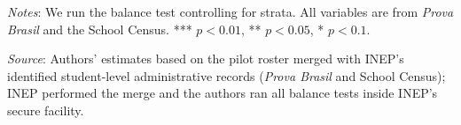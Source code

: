 \documentclass[
	article,			%
	12pt,				%
	oneside,			%
	a4paper,			%
	]{article}
\begin{document}
\begin{table}[h!]
\begin{threeparttable}
\begin{tabular*}{\textwidth}{@{\extracolsep{\fill}}lccccc@{}}
\bottomrule
\end{tabular*}
\begin{tablenotes}
\fontsize{9}{9}\selectfont
\item \textit{Notes}: We run the balance test controlling for strata. All variables are from \textit{Prova Brasil} and the School Census. *** $p<0.01$, ** $p<0.05$, * $p<0.1$.
\item \textit{Source}: Authors' estimates based on the pilot roster merged with INEP's identified student-level administrative records (\textit{Prova Brasil} and School Census); INEP performed the merge and the authors ran all balance tests inside INEP's secure facility.
\end{tablenotes}
\end{threeparttable}
\end{table}
\restoregeometry
\end{document}
